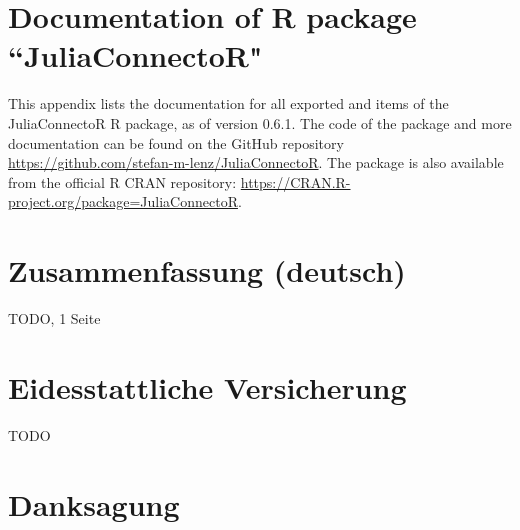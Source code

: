 \documentclass[12pt]{article}
\begin{document}
\begin{appendices}

\clearpage
\section[Documentation of R package ``JuliaConnectoR"]{Documentation of R package \\ ``JuliaConnectoR"}
This appendix lists the documentation for all exported and items of the JuliaConnectoR R package, as of version 0.6.1. The code of the package and more documentation can be found on the GitHub repository \url{https://github.com/stefan-m-lenz/JuliaConnectoR}. The package is also available from the official R CRAN repository: \url{https://CRAN.R-project.org/package=JuliaConnectoR}.




\section{Zusammenfassung (deutsch)}
TODO, 1 Seite

\section{Eidesstattliche Versicherung}
TODO

\section{Danksagung}



\end{appendices}
\end{document}
